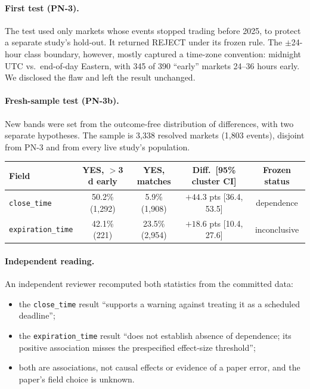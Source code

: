\documentclass[10pt]{article}
\newcommand{\code}[1]{\texttt{#1}}
\begin{document}
\paragraph{First test (PN-3).} The test used only markets whose events stopped
trading before 2025, to protect a separate study's hold-out. It returned REJECT
under its frozen rule. The $\pm$24-hour class boundary, however, mostly captured
a time-zone convention: midnight UTC vs.\ end-of-day Eastern, with 345 of 390
``early'' markets 24--36 hours early. We disclosed the flaw and left the result
unchanged.

\paragraph{Fresh-sample test (PN-3b).} New bands were set from the outcome-free
distribution of differences, with two separate hypotheses. The sample is 3,338
resolved markets (1,803 events), disjoint from PN-3 and from every live study's
population.

\begin{table}[h]\centering\small
\setlength{\tabcolsep}{4pt}\begin{tabular}{lcccc}\toprule
Field & YES, $>$3 d early & YES, matches & Diff.\ [95\% cluster CI] & Frozen status\\\midrule
\code{close\_time} & 50.2\% (1,292) & 5.9\% (1,908) & $+44.3$ pts [36.4, 53.5] & dependence\\
\code{expiration\_time} & 42.1\% (221) & 23.5\% (2,954) & $+18.6$ pts [10.4, 27.6] & inconclusive\\\bottomrule
\end{tabular}
\end{table}

\paragraph{Independent reading.} An independent reviewer recomputed both
statistics from the committed data:
\begin{itemize}[nosep]
  \item the \code{close\_time} result ``supports a warning against treating it
        as a scheduled deadline'';
  \item the \code{expiration\_time} result ``does not establish absence of
        dependence; its positive association misses the prespecified
        effect-size threshold'';
  \item both are associations, not causal effects or evidence of a paper error,
        and the paper's field choice is unknown.
\end{itemize}
\end{document}
